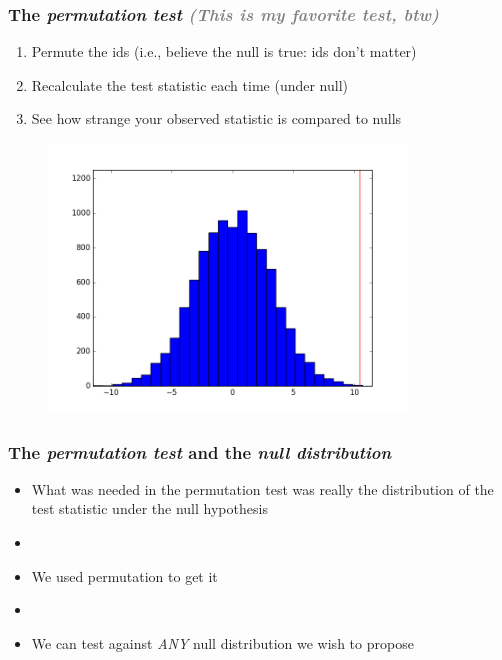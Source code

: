 \documentclass[xcolor={dvipsnames}]{beamer}
\begin{document}
\frame
{
 \frametitle{The \emph{permutation test} \textcolor{gray}{\emph{(This is my \textbf{favorite} test, btw)}}}

\begin{enumerate}
\item Permute the ids (i.e., believe the null is true: ids don't matter)
\item Recalculate the test statistic each time (under null)
\item See how strange your observed statistic is compared to nulls 
\end{enumerate}
\vspace{-.75em}
\begin{figure}
\centering
\includegraphics[width=3.75in]{stuffs/testStat_nullDist.png}
\end{figure}

}

\frame
{
 \frametitle{The \emph{permutation test} and the \emph{null distribution}}

\begin{itemize}
\item What was needed in the permutation test was really the distribution of the test statistic under the null hypothesis
\item[]
\item<2-> We used permutation to get it\\ 
\item[]
\item<4-> We can test against \emph{ANY} null distribution we wish to propose
\end{itemize}
}
\end{document}
